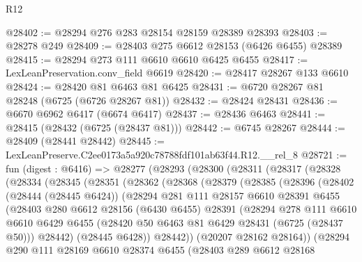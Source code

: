 \begin{lexlean}{R12}
\begin{coremodule}
@28402 := @28294 @276 @283 @28154 @28159 @28389 @28393
@28403 := @28278 @249
@28409 := @28403 @275 @6612 @28153 (@6426 @6455) @28389
@28415 := @28294 @273 @111 @6610 @6610 @6425 @6455
@28417 := LexLeanPreservation.conv_field @6619
@28420 := @28417 @28267 @133 @6610
@28424 := @28420 @81 @6463 @81 @6425
@28431 := @6720 @28267 @81 @28248 (@6725 (@6726 @28267 @81))
@28432 := @28424 @28431
@28436 := @6670 @6962 @6417 (@6674 @6417)
@28437 := @28436 @6463
@28441 := @28415 (@28432 (@6725 (@28437 @81)))
@28442 := @6745 @28267
@28444 := @28409 (@28441 @28442)
@28445 := LexLeanPreserve.C2ee0173a5a920c78788fdf101ab63f44.R12.__rel_8
@28721 := fun (digest : @6416) =>
  @28277
    (@28293
      (@28300
        (@28311
          (@28317
            (@28328
              (@28334
                (@28345
                  (@28351
                    (@28362
                      (@28368
                        (@28379
                          (@28385
                            (@28396
                              (@28402
                                (@28444 (@28445 @6424))
                                (@28294
                                  @281
                                  @111
                                  @28157
                                  @6610
                                  @28391
                                  @6455
                                  (@28403
                                    @280
                                    @6612
                                    @28156
                                    (@6430 @6455)
                                    @28391
                                    (@28294
                                      @278
                                      @111
                                      @6610
                                      @6610
                                      @6429
                                      @6455
                                      (@28420 @50 @6463 @81 @6429 @28431 (@6725 (@28437 @50)))
                                      @28442)
                                    (@28445 @6428))
                                  @28442))
                              (@20207 @28162 @28164))
                            (@28294
                              @290
                              @111
                              @28169
                              @6610
                              @28374
                              @6455
                              (@28403
                                @289
                                @6612
                                @28168

\end{coremodule}
\end{lexlean}
